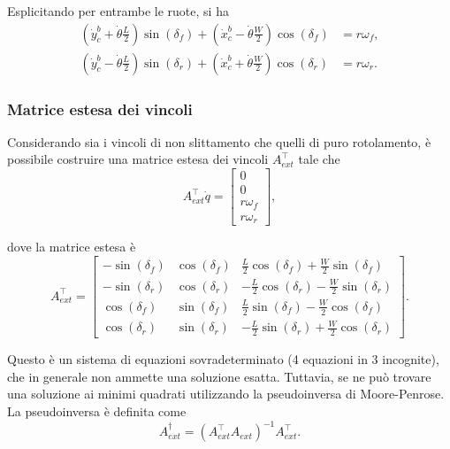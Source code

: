Esplicitando per entrambe le ruote, si ha
\begin{align}
    \left(\dot{y}_c^b + \dot{\theta} \frac{L}{2}\right) \sin(\delta_f) + \left(\dot{x}_c^b - \dot{\theta} \frac{W}{2}\right) \cos(\delta_f) & = r \omega_f, \label{eq:rolling_f} \\
    \left(\dot{y}_c^b - \dot{\theta} \frac{L}{2}\right) \sin(\delta_r) + \left(\dot{x}_c^b + \dot{\theta} \frac{W}{2}\right) \cos(\delta_r) & = r \omega_r. \label{eq:rolling_r}
\end{align}

\subsubsection{Matrice estesa dei vincoli}
Considerando sia i vincoli di non slittamento che quelli di puro rotolamento, è possibile costruire una matrice estesa dei vincoli $A_{ext}^\top$ tale che
\begin{equation}\label{eq:extended_constraints}
    A_{ext}^\top \dot{q} = \begin{bmatrix}
        0          \\
        0          \\
        r \omega_f \\
        r \omega_r
    \end{bmatrix},
\end{equation}

dove la matrice estesa è
\begin{equation}\label{eq:Aext}
    A_{ext}^\top = \begin{bmatrix}
        -\sin(\delta_f) & \cos(\delta_f) & \frac{L}{2}\cos(\delta_f) + \frac{W}{2}\sin(\delta_f)  \\
        -\sin(\delta_r) & \cos(\delta_r) & -\frac{L}{2}\cos(\delta_r) - \frac{W}{2}\sin(\delta_r) \\
        \cos(\delta_f)  & \sin(\delta_f) & \frac{L}{2}\sin(\delta_f) - \frac{W}{2}\cos(\delta_f)  \\
        \cos(\delta_r)  & \sin(\delta_r) & -\frac{L}{2}\sin(\delta_r) + \frac{W}{2}\cos(\delta_r)
    \end{bmatrix}.
\end{equation}

Questo è un sistema di equazioni sovradeterminato (4 equazioni in 3 incognite), che in generale non ammette una soluzione esatta. Tuttavia, se ne può trovare una soluzione ai minimi quadrati utilizzando la pseudoinversa di Moore-Penrose. La pseudoinversa è definita come
\begin{equation}\label{eq:pseudoinverse}
    A_{ext}^\dagger = \left(A_{ext}^\top A_{ext}\right)^{-1} A_{ext}^\top.
\end{equation}

